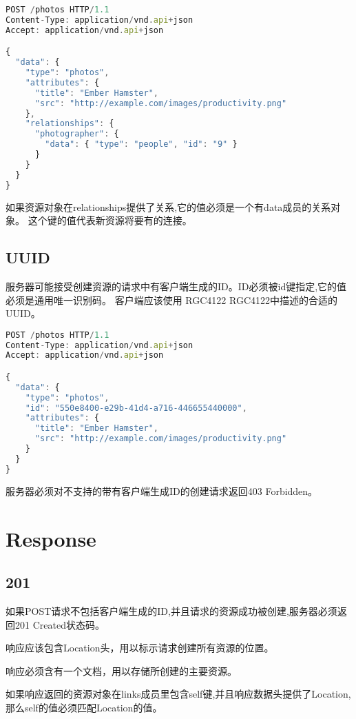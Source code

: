 \begin{lstlisting}[language=JavaScript]
POST /photos HTTP/1.1
Content-Type: application/vnd.api+json
Accept: application/vnd.api+json

{
  "data": {
    "type": "photos",
    "attributes": {
      "title": "Ember Hamster",
      "src": "http://example.com/images/productivity.png"
    },
    "relationships": {
      "photographer": {
        "data": { "type": "people", "id": "9" }
      }
    }
  }
}
\end{lstlisting}


如果资源对象在relationships提供了关系,它的值必须是一个有data成员的关系对象。 这个键的值代表新资源将要有的连接。

\subsection{UUID}

服务器可能接受创建资源的请求中有客户端生成的ID。ID必须被id键指定,它的值必须是通用唯一识别码。 客户端应该使用 RGC4122 RGC4122中描述的合适的UUID。

\begin{lstlisting}[language=JavaScript]
POST /photos HTTP/1.1
Content-Type: application/vnd.api+json
Accept: application/vnd.api+json

{
  "data": {
    "type": "photos",
    "id": "550e8400-e29b-41d4-a716-446655440000",
    "attributes": {
      "title": "Ember Hamster",
      "src": "http://example.com/images/productivity.png"
    }
  }
}
\end{lstlisting}

服务器必须对不支持的带有客户端生成ID的创建请求返回403 Forbidden。

\section{Response}

\subsection{201}

如果POST请求不包括客户端生成的ID,并且请求的资源成功被创建,服务器必须返回201 Created状态码。

响应应该包含Location头，用以标示请求创建所有资源的位置。

响应必须含有一个文档，用以存储所创建的主要资源。

如果响应返回的资源对象在links成员里包含self键,并且响应数据头提供了Location, 那么self的值必须匹配Location的值。


